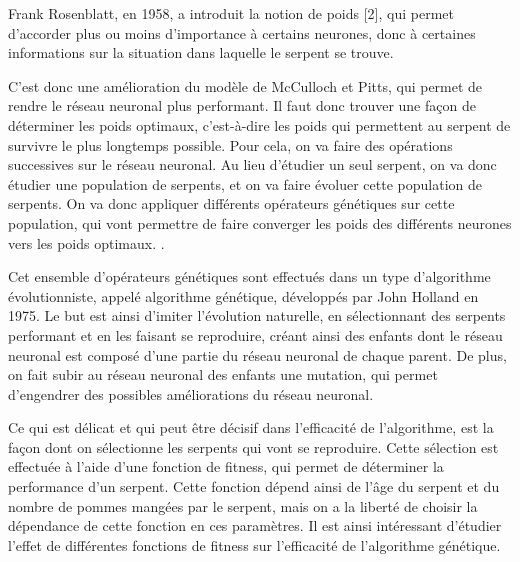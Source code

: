 \documentclass[11pt,a4paper]{article}
\begin{document}
Frank Rosenblatt, en 1958, a introduit la notion de poids [2], qui permet d'accorder plus ou moins d'importance à certains neurones, donc à certaines informations sur la situation dans laquelle le serpent se trouve.

C'est donc une amélioration du modèle de McCulloch et Pitts, qui permet de rendre le réseau neuronal plus performant.
Il faut donc trouver une façon de déterminer les poids optimaux, c'est-à-dire les poids qui permettent au serpent de survivre le plus longtemps possible.
Pour cela, on va faire des opérations successives sur le réseau neuronal.
Au lieu d'étudier un seul serpent, on va donc étudier une population de serpents, et on va faire évoluer cette population de serpents.
On va donc appliquer différents opérateurs génétiques sur cette population, qui vont permettre de faire converger les poids des différents neurones vers les poids optimaux. \cite{poli2008field,whitley1994geneticAlgorithmTutorial}.





Cet ensemble d'opérateurs génétiques sont effectués dans un type d'algorithme évolutionniste, appelé algorithme génétique, développés par John Holland en 1975.
Le but est ainsi d'imiter l'évolution naturelle, en sélectionnant des serpents performant et en les faisant se reproduire, créant ainsi des enfants dont le réseau neuronal est composé d'une partie du réseau neuronal de chaque parent.
De plus, on fait subir au réseau neuronal des enfants une mutation, qui permet d'engendrer des possibles améliorations du réseau neuronal.

Ce qui est délicat et qui peut être décisif dans l'efficacité de l'algorithme, est la façon dont on sélectionne les serpents qui vont se reproduire.
Cette sélection est effectuée à l'aide d'une fonction de fitness, qui permet de déterminer la performance d'un serpent.
Cette fonction dépend ainsi de l'âge du serpent et du nombre de pommes mangées par le serpent, mais on a la liberté de choisir la dépendance de cette fonction en ces paramètres.
Il est ainsi intéressant d'étudier l'effet de différentes fonctions de fitness sur l'efficacité de l'algorithme génétique.
\end{document}
